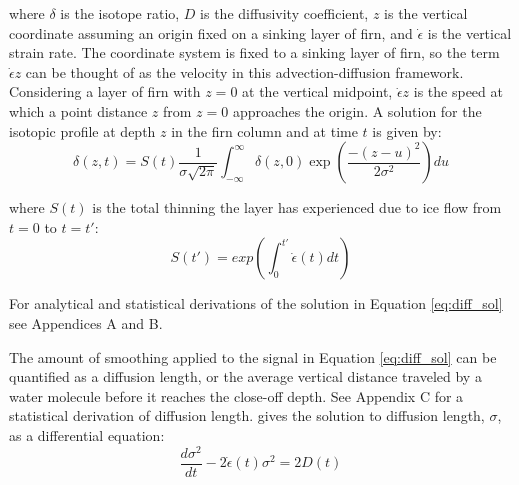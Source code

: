 \documentclass[draft, jgrga]{AGUTeX}
\begin{document}
\begin{article}
where \begin{math} \delta \end{math} is the isotope ratio, \begin{math} D \end{math} is the diffusivity coefficient, \begin{math} z \end{math} is the vertical coordinate assuming an origin fixed on a sinking layer of firn, and \begin{math} \dot{\epsilon} \end{math} is the vertical strain rate. The coordinate system is fixed to a sinking layer of firn, so the term \begin{math} \dot{\epsilon} z \end{math} can be thought of as the velocity in this advection-diffusion framework. Considering a layer of firn with \begin{math} z = 0 \end{math} at the vertical midpoint, \begin{math} \dot{\epsilon} z \end{math} is the speed at which a point distance \begin{math} z \end{math} from \begin{math} z=0 \end{math} approaches the origin. A solution for the isotopic profile at depth $z$ in the firn column and at time $t$ is given by:
\begin{equation}
\label{eq:diff_sol}
\delta (z,t) = S(t) \frac{1}{\sigma \sqrt{2 \pi}}
\int^\infty_{-\infty} \delta (z,0) \exp \left(\frac{-(z-u)^2}{2 \sigma ^2} \right)du
\end{equation}

where \begin{math} S(t) \end{math} is the total thinning the layer has experienced due to ice flow from $t=0$ to $t=t'$:
\begin{equation}
S(t') = exp \left( \int^{t'}_{0} \dot{\epsilon}(t) dt \right)
\end{equation}

For analytical and statistical derivations of the solution in Equation \ref{eq:diff_sol} see Appendices A and B.

The amount of smoothing applied to the signal in Equation \ref{eq:diff_sol} can be quantified as a diffusion length, or the average vertical distance traveled by a water molecule before it reaches the close-off depth. See Appendix C for a statistical derivation of diffusion length. \citet{Johnsen1977} gives the solution to diffusion length, $\sigma$, as a differential equation:
\begin{equation}
  \label{eq:sigma_differential}
  \frac{d\sigma^2}{dt} - 2 \dot{\epsilon}(t)\sigma^2 = 2D(t)
\end{equation}


\end{article}
\end{document}
